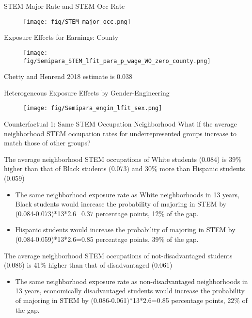 \documentclass[aspectratio=169,xcolor=dvipsnames]{beamer}
\newenvironment{wideitemize}{\itemize\addtolength{\itemsep}{10pt}}{\enditemize}
\begin{document}
\begin{frame}{STEM Major Rate and STEM Occ Rate}\label{STEM_major_occ}
\begin{figure}[H]
    \centering
    		\texttt{[image: fig/STEM\_major\_occ.png]}
    \end{figure}
\hyperlink{tab_STEMOcc}{}
\end{frame}

\begin{frame}{Exposure Effects for Earnings: County}\label{county_earnings}
\begin{figure}[H]
    \centering
    		\texttt{[image: fig/Semipara\_STEM\_lfit\_para\_p\_wage\_WO\_zero\_county.png]}
	
    \end{figure}
Chetty and Henrend 2018 estimate is 0.038
\hyperlink{earnings}{}
\end{frame}

\begin{frame}{Heterogeneous Exposure Effects by Gender-Engineering}\label{hetero_sex_engin}
\begin{figure}[H]
    \centering
    		\texttt{[image: fig/Semipara\_engin\_lfit\_sex.png]}
    \end{figure}
\hyperlink{hetero_sex}{}
\end{frame}

\begin{frame}{Counterfactual 1: Same STEM Occupation Neighborhood}\label{counterfactual1_occ}
What if the average neighborhood STEM occupation rates for underrepresented groups increase to match those of other groups?
\begin{wideitemize}
    \item The average neighborhood STEM occupations of White students (0.084) is 39\% higher than that of Black students (0.073) and 30\% more than Hispanic students (0.059)
    \begin{itemize}
        \item The same neighborhood exposure rate as White neighborhoods in 13 years, Black students would increase the probability of majoring in STEM by (0.084-0.073)*13*2.6=0.37 percentage points, 12\% of the gap. 
        \item Hispanic students would increase the probability of majoring in STEM by (0.084-0.059)*13*2.6=0.85 percentage points, 39\% of the gap. 
    \end{itemize}
    \item The average neighborhood STEM occupations of not-disadvantaged students  (0.086) is 41\% higher than that of disadvantaged (0.061)
    \begin{itemize}
        \item The same neighborhood exposure rate as non-disadvantaged neighborhoods in 13 years, economically disadvantaged students would increase the probability of majoring in STEM by (0.086-0.061)*13*2.6=0.85 percentage points, 22\% of the gap.
    \end{itemize}
\end{wideitemize}
\hyperlink{counterfactual1}{}
\end{frame}
\end{document}
